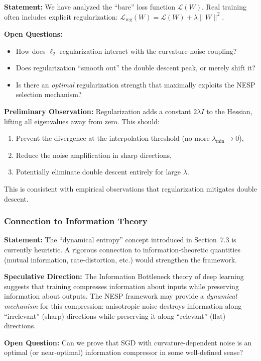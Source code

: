 \documentclass[
  journal=largetwo,
  simfonts=false,
  year=2025,
  volume=37,
]{cup-journal}
\begin{document}
\textbf{Statement:} We have analyzed the ``bare'' loss function $\mathcal{L}(W)$. Real training often includes explicit regularization: $\mathcal{L}_{\text{reg}}(W) = \mathcal{L}(W) + \lambda \|W\|^2$.

\textbf{Open Questions:}
\begin{itemize}
    \item How does $\ell_2$ regularization interact with the curvature-noise coupling?
    \item Does regularization ``smooth out'' the double descent peak, or merely shift it?
    \item Is there an \textit{optimal} regularization strength that maximally exploits the NESP selection mechanism?
\end{itemize}

\textbf{Preliminary Observation:} Regularization adds a constant $2\lambda I$ to the Hessian, lifting all eigenvalues away from zero. This should:
\begin{enumerate}
    \item Prevent the divergence at the interpolation threshold (no more $\lambda_{\min} \to 0$),
    \item Reduce the noise amplification in sharp directions,
    \item Potentially eliminate double descent entirely for large $\lambda$.
\end{enumerate}
This is consistent with empirical observations that regularization mitigates double descent.

\subsubsection{Connection to Information Theory}

\textbf{Statement:} The ``dynamical entropy'' concept introduced in Section~7.3 is currently heuristic. A rigorous connection to information-theoretic quantities (mutual information, rate-distortion, etc.) would strengthen the framework.

\textbf{Speculative Direction:} The Information Bottleneck theory of deep learning suggests that training compresses information about inputs while preserving information about outputs. The NESP framework may provide a \textit{dynamical mechanism} for this compression: anisotropic noise destroys information along ``irrelevant'' (sharp) directions while preserving it along ``relevant'' (flat) directions.

\textbf{Open Question:} Can we prove that SGD with curvature-dependent noise is an optimal (or near-optimal) information compressor in some well-defined sense?
\end{document}
